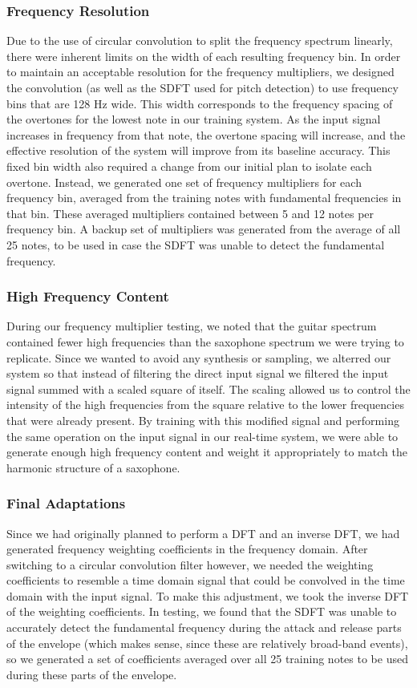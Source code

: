 \documentclass[twoside,a4paper]{article}
\begin{document}
\subsubsection{Frequency Resolution}
Due to the use of circular convolution to split the frequency spectrum
linearly, there were inherent limits on the width of each resulting frequency
bin. In order to maintain an acceptable resolution for the frequency multipliers,
we designed the convolution (as well as the SDFT used for pitch detection) to use frequency bins that are 128 Hz wide. This
width corresponds to the frequency spacing of the overtones for the lowest note
in our training system. As the input signal increases in frequency from that note,
the overtone spacing will increase, and the effective resolution of the system will
improve from its baseline accuracy. This fixed bin width also required a change from
our initial plan to isolate each overtone. Instead, we generated one set of frequency
multipliers for each frequency bin, averaged from the training notes with fundamental
frequencies in that bin. These averaged multipliers contained between 5 and 12 notes
per frequency bin. A backup set of multipliers was generated from the average of all 25
notes, to be used in case the SDFT was unable to detect the fundamental frequency.

\subsubsection{High Frequency Content}
During our frequency multiplier testing, we noted that the guitar spectrum
contained fewer high frequencies than the saxophone spectrum we were trying to
replicate. Since we wanted to avoid any synthesis or
sampling, we alterred our system so that instead of filtering the direct input signal
we filtered the input signal summed with a scaled square of itself. The scaling
allowed us to control the intensity of the high frequencies from the square relative
to the lower frequencies that were already present. By training with this modified signal
and performing the same operation on the input signal in our real-time system, we were able
to generate enough high frequency content and weight it appropriately to match the harmonic
structure of a saxophone.

\subsubsection{Final Adaptations}
Since we had originally planned to perform a DFT and an inverse DFT,
we had generated frequency weighting coefficients in the frequency domain.
After switching to a circular convolution filter however, we needed the weighting
coefficients to resemble a time domain signal that could be convolved in the time domain
with the input signal. To make this adjustment, we took the inverse DFT of the
weighting coefficients. In testing, we found that the SDFT was unable to accurately
detect the fundamental frequency during the attack and release parts of the envelope
(which makes sense, since these are relatively broad-band events), so we generated
a set of coefficients averaged over all 25 training notes to be used during these parts of the envelope.
\end{document}
